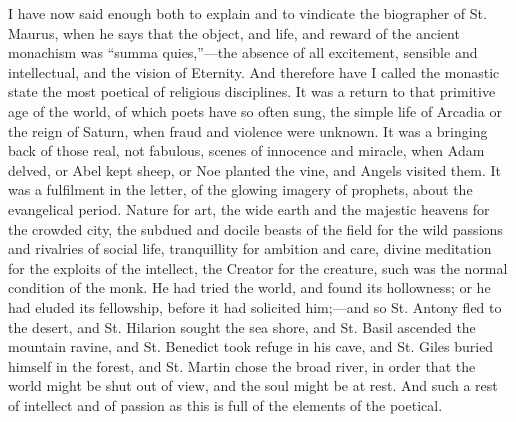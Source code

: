 I have now said enough both to explain and to vindicate the
biographer of St. Maurus, when he says that the object, and life, and
reward of the ancient monachism was ``summa quies,''—the
absence of all excitement, sensible and intellectual, and the vision
of Eternity. And therefore have I called the monastic state the most
poetical of religious disciplines. It was a return to that primitive
age of the world, of which poets have so often sung, the simple life
of Arcadia or the reign of Saturn, when fraud and violence were
unknown. It was a bringing back of those real, not fabulous, scenes of
innocence and miracle, when Adam delved, or Abel kept sheep, or Noe
planted the vine, and Angels visited them. It was a fulfilment in the
letter, of the glowing imagery of prophets, about the evangelical
period. Nature for art, the wide earth and the majestic heavens for
the crowded city, the subdued and docile beasts of the field for the
wild passions and rivalries of social life, tranquillity for ambition
and care, divine meditation for the exploits of the intellect, the
Creator for the creature, such was the normal condition of the monk.
He had tried the world, and found its hollowness; or he had eluded its
fellowship, before it had solicited him;—and so St. Antony fled to
the desert, and St. Hilarion sought the sea shore, and St. Basil
ascended the mountain ravine, and St. Benedict took refuge in his
cave, and St. Giles buried himself in the forest, and St. Martin chose
the broad river, in order that the world might be shut out
of view, and the soul might be at rest. And such a rest of
intellect and of passion as this is full of the elements of the
poetical.

